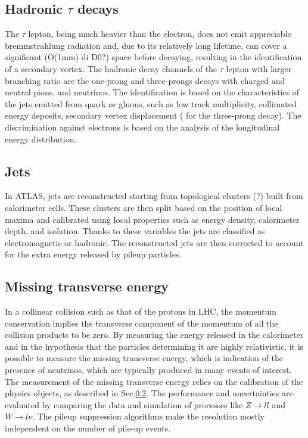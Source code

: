 \documentclass[a4paper,twoside,12pt]{article}
\begin{document}
\subsection{Hadronic $\tau$ decays}
The $\tau$ lepton, being much heavier than the electron, does not emit appreciable 
bremmstrahlung radiation and, due to its relatively long lifetime, can cover a significant 
(O(1mm) di D0?) space before decaying, resulting in the identification of a secondary vertex.
The hadronic decay channels of the $\tau$ lepton with larger branching ratio are the 
one-prong and three-prongs decays with charged and neutral pions, and neutrinos. The
identification is based on the characteristics of the jets emitted from quark or gluons, such 
as low track multiplicity, collimated energy deposits, secondary vertex displacement (
for the three-prong decay). The discrimination against electrons is based on the analysis
of the longitudinal energy distribution. 

\subsection{Jets}\label{subsec:jets}
In ATLAS, jets are reconstructed starting from topological clusters (?) built from calorimeter cells. These clusters are then split based on the position of local maxima and calibrated using
local properties such as energy density, calorimeter depth, and isolation. Thanks to these 
variables the jets are classified as electromagnetic or hadronic. The reconstructed jets are
then corrected to account for the extra energy released by pileup particles.

\subsection{Missing transverse energy}
In a collinear collision such as that of the protons in LHC, the momentum conservation 
implies the transverse component of the momentum of all the collision products to be zero. 
By measuring the energy released in the calorimeter and in the hypothesis that the particles determining it are highly relativistic, it is possible to measure the missing transverse energy, 
which is indication of the presence of neutrinos, which are typically produced in many events 
of interest. The measurement of the missing transverse energy relies on the calibration of the 
physics objects, as described in Sec.\ref{subsec:jets}. The performance and uncertainties are 
evaluated by comparing the data and simulation of processes like $Z \rightarrow ll$ and 
$W \rightarrow l\nu$. The pileup suppression algorithms make the resolution mostly independent on
the number of pile-up events.
\end{document}
